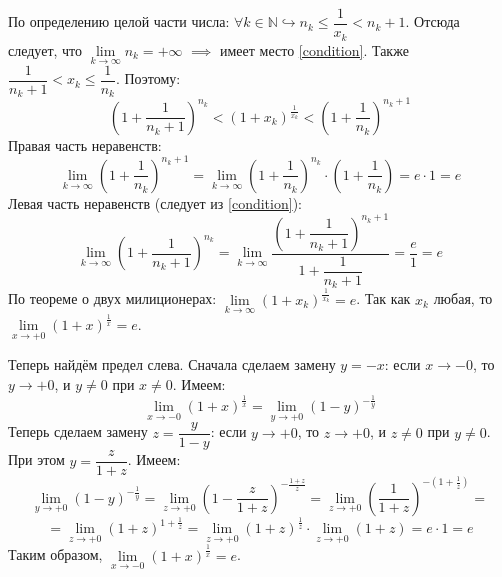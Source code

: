 \documentclass[12pt, a4paper, reqno]{article}
\begin{document}
    По определению целой части числа: $\forall k\in\mathbb{N}\hookrightarrow n_k \leq \dfrac{1}{x_k}
    < n_k + 1$. Отсюда следует, что $\lim\limits_{k\to\infty} n_k = +\infty$ $\implies$ имеет место
    \eqref{condition}. Также $\dfrac{1}{n_k + 1} < x_k \leq \dfrac{1}{n_k}$. Поэтому:
    \begin{equation*}
        \left(1 + \dfrac{1}{n_k + 1}\right)^{n_k} < (1 + x_k)^{\frac{1}{x_k}} <
        \left(1 + \dfrac{1}{n_k}\right)^{n_k + 1}
    \end{equation*}
    Правая часть неравенств:
    \begin{equation*}
        \lim\limits_{k\to\infty} \left(1 + \dfrac{1}{n_k}\right)^{n_k + 1} =
        \lim\limits_{k\to\infty} \left(1 + \dfrac{1}{n_k}\right)^{n_k}\cdot
        \left(1 + \dfrac{1}{n_k}\right) = e\cdot 1 = e
    \end{equation*}
    Левая часть неравенств (следует из \eqref{condition}):
    \begin{equation*}
        \lim\limits_{k\to\infty} \left(1 + \dfrac{1}{n_k + 1}\right)^{n_k} =
        \lim\limits_{k\to\infty} \dfrac{\left(1 + \dfrac{1}{n_k + 1}\right)^{n_k + 1}}
        {1 + \dfrac{1}{n_k + 1}} = \dfrac{e}{1} = e
    \end{equation*}
    По теореме о двух милиционерах: $\lim\limits_{k\to\infty} (1 + x_k)^{\frac{1}{x_k}} = e$. Так
    как $x_k$ любая, то $\lim\limits_{x\to +0} (1 + x)^{\frac{1}{x}} = e$.

    Теперь найдём предел слева. Сначала сделаем замену $y = -x$: если $x\to -0$, то $y\to +0$, и
    $y\neq 0$ при $x\neq 0$. Имеем:
    \begin{equation*}
        \lim\limits_{x\to -0} (1 + x)^{\frac{1}{x}} = \lim\limits_{y\to +0} (1 - y)^{-\frac{1}{y}}
    \end{equation*}
    Теперь сделаем замену $z = \dfrac{y}{1 - y}$: если $y\to +0$, то $z\to +0$, и $z\neq 0$ при
    $y\neq 0$. При этом $y = \dfrac{z}{1 + z}$. Имеем:
    \begin{equation*}
        \lim\limits_{y\to +0} (1 - y)^{-\frac{1}{y}} =
        \lim\limits_{z\to +0} {\left(1 - \dfrac{z}{1 + z}\right)}^{-\frac{1+z}{z}} =
        \lim\limits_{z\to +0} \left(\dfrac{1}{1 + z}\right)^{-\left(1 + \frac{1}{z}\right)} =
    \end{equation*}
    \begin{equation*}
        = \lim\limits_{z\to +0} (1 + z)^{1 + \frac{1}{z}} =
        \lim\limits_{z\to +0} (1 + z)^{\frac{1}{z}}\cdot\lim\limits_{z\to +0} (1 + z) =
        e\cdot 1 = e
    \end{equation*}
    Таким образом, $\lim\limits_{x\to -0} (1 + x)^{\frac{1}{x}} = e$.
\end{document}
